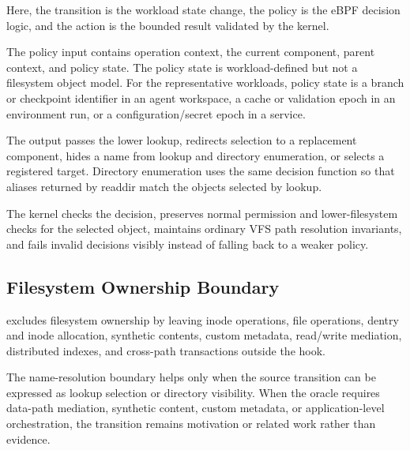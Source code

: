 Here, the transition is the workload state change, the policy is the eBPF
decision logic, and the action is the bounded result validated by the kernel.

The policy input contains operation context, the current component, parent
context, and policy state. The policy state is workload-defined but not a
filesystem object model. For the representative workloads, policy state is a
branch or checkpoint identifier in an agent workspace, a cache or validation
epoch in an environment run, or a configuration/secret epoch in a service.

The output passes the lower lookup, redirects selection to a replacement
component, hides a name from lookup and directory enumeration, or selects a
registered target. Directory enumeration uses the same decision function so
that aliases returned by readdir match the objects selected by lookup.

The kernel checks the decision, preserves normal permission and
lower-filesystem checks for the selected object, maintains ordinary VFS path
resolution invariants, and fails invalid decisions visibly instead of falling
back to a weaker policy.

\subsection{Filesystem Ownership Boundary}

\namei excludes filesystem ownership by leaving inode operations, file
operations, dentry and inode allocation, synthetic contents, custom metadata,
read/write mediation, distributed indexes, and cross-path transactions outside
the hook.

The name-resolution boundary helps only when the source transition can
be expressed as lookup selection or directory visibility. When the oracle
requires data-path mediation, synthetic content, custom metadata, or
application-level orchestration, the transition remains motivation or related
work rather than \namei evidence.
